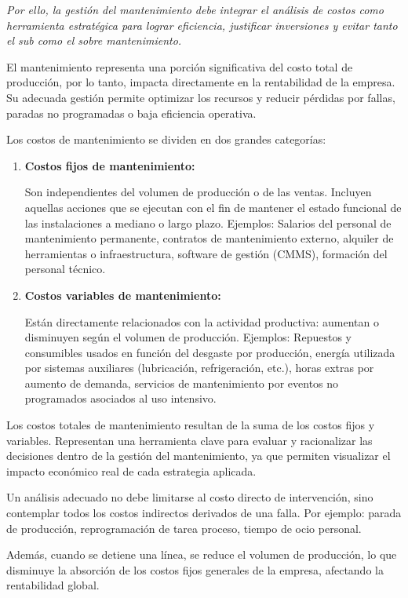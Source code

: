\documentclass[a4paper,oneside,11pt]{article}
\begin{document}
\textit{Por ello, la gestión del mantenimiento debe integrar el análisis de costos como herramienta estratégica para lograr eficiencia, justificar inversiones y evitar tanto el sub como el sobre mantenimiento.}

El mantenimiento representa una porción significativa del costo total de producción, por lo tanto, impacta directamente en la rentabilidad de la empresa. Su adecuada gestión permite optimizar los recursos y reducir pérdidas por fallas, paradas no programadas o baja eficiencia operativa.

Los costos de mantenimiento se dividen en dos grandes categorías:

\begin{enumerate}
    \item \textbf{Costos fijos de mantenimiento:}

    Son independientes del volumen de producción o de las ventas.
    Incluyen aquellas acciones que se ejecutan con el fin de mantener el estado funcional de las instalaciones a mediano o largo plazo.
    Ejemplos: Salarios del personal de mantenimiento permanente, contratos de mantenimiento externo, alquiler de herramientas o infraestructura, software de gestión (CMMS), formación del personal técnico.
    \item \textbf{Costos variables de mantenimiento:}

    Están directamente relacionados con la actividad productiva: aumentan o disminuyen según el volumen de producción.
    Ejemplos: Repuestos y consumibles usados en función del desgaste por producción, energía utilizada por sistemas auxiliares (lubricación, refrigeración, etc.), horas extras por aumento de demanda, servicios de mantenimiento por eventos no programados asociados al uso intensivo.
\end{enumerate}

Los costos totales de mantenimiento resultan de la suma de los costos fijos y variables. Representan una herramienta clave para evaluar y racionalizar las decisiones dentro de la gestión del mantenimiento, ya que permiten visualizar el impacto económico real de cada estrategia aplicada.

Un análisis adecuado no debe limitarse al costo directo de intervención, sino contemplar todos los costos indirectos derivados de una falla. Por ejemplo: parada de producción, reprogramación de tarea proceso, tiempo de ocio personal.

Además, cuando se detiene una línea, se reduce el volumen de producción, lo que disminuye la absorción de los costos fijos generales de la empresa, afectando la rentabilidad global.
\end{document}
